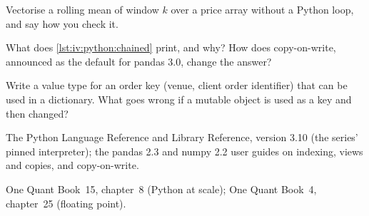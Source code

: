 \begin{interviewq}\label{iq:iv:python:11}
Vectorise a rolling mean of window $k$ over a price array without a Python loop, and say how you check it.
\end{interviewq}

\label{lst:iv:python:chained}

\begin{interviewq}\label{iq:iv:python:12}
What does \cref{lst:iv:python:chained} print, and why? How does copy-on-write, announced as the default for pandas 3.0, change the answer?
\end{interviewq}

\begin{interviewq}\label{iq:iv:python:13}
Write a value type for an order key (venue, client order identifier) that can be used in a dictionary. What goes wrong if a
mutable object is used as a key and then changed?
\end{interviewq}

\begin{omsources}
\item The Python Language Reference and Library Reference, version 3.10 (the series' pinned interpreter); the pandas 2.3 and
numpy 2.2 user guides on indexing, views and copies, and copy-on-write.
\item One Quant Book~15, chapter~8 (Python at scale); One Quant Book~4, chapter~25 (floating point).
\end{omsources}
